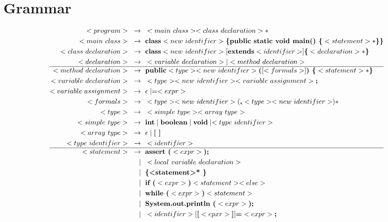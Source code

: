 \documentclass[a4paper,12pt]{article}
\newcommand{\bb}[1]{\textbf{#1}}
\newcommand{\s}{\text{ }}
\newcommand{\bracel}{\textbraceleft}
\newcommand{\bracer}{\textbraceright}
\begin{document}
\section{Grammar}
\begingroup\footnotesize
\begin{align*}
<program>\s \to \s &<main\s class> <class\s declaration>* \\
<main\s class>\s \to \s &\bb{class} <new\s identifier> \bb{\bracel public static void main() \bracel} <statement>* \bb{\bracer \bracer}\\
<class\s declaration>\s \to \s &\bb{class} <new\s identifier> [\bb{extends} <identifier>] \bb{\bracel}<declaration>* \bb{\bracer}\\
<declaration>\s \to \s &<variable\s declaration> | <method\s declaration> \\ 
\hline
<method\s declaration>\s \to \s &\bb{public} <type> <new\s identifier> \bb{(} [ <formals> ] \bb{) \bracel} <statement>* \bb{\bracer}\\
<variable\s declaration>\s \to \s &<type> <new\s identifier> <variable\s assignment>\bb{;}\\
<variable\s assignment>\s \to \s &\epsilon \mid = <expr>\\
<formals>\s \to \s &<type> <new\s identifier> ( \bb{,} <type> <new\s identifier> )*\\
<type>\s \to \s &<simple\s type> <array\s type>\\
<simple\s type>\s \to \s &\bb{int} \mid \bb{boolean} \mid \bb{void} \mid <type\s identifier>\\
<array\s type>\s \to \s &\epsilon \mid \bb{[ ]}\\
<type\s identifier>\s \to \s &<identifier> \\
\hline
<statement>\s \to \s &\bb{assert (} <expr> \bb{);}  \\
             \mid \s &<local\s variable\s declaration>  \\
             \mid \s &\bb{\bracel <statement>* \bracer}  \\
             \mid \s &\bb{if (} <expr> \bb{)} <statement> <else> \\
             \mid \s &\bb{while (} <expr> \bb{)} <statement>  \\
             \mid \s &\bb{System.out.println (} <expr> \bb{);}  \\
             \mid \s &<identifier>[\bb{[}<epxr>\bb{]}] \bb{=} <expr> \bb{;}  \\

\end{align*}
\end{document}
